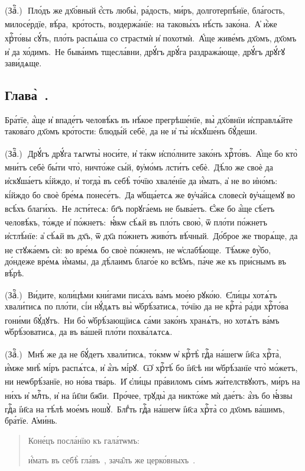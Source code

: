 (Заⷱ҇\:.)~\textsuperscript{}\,Пло́дъ же дх҃о́вный є҆́сть любы̀, ра́дость, ми́ръ, долготерпѣ́нїе, бла́гость, милосе́рдїе, вѣ́ра, \textsuperscript{}\,кро́тость, воздержа́нїе: на таковы́хъ нѣ́сть зако́на. \textsuperscript{}\,А҆ и҆̀же хрⷭ҇то́вы сꙋ́ть, пло́ть распѧ́ша со страстмѝ и҆ похотмѝ. \textsuperscript{}\,А҆́ще живе́мъ дх҃омъ, дх҃омъ и҆ да хо́димъ. \textsuperscript{}\,Не быва́имъ тщесла́вни, дрꙋ́гъ дрꙋ́га раздража́юще, дрꙋ́гъ дрꙋ́гꙋ зави́дѧще.

\subsection{Глава̀~.}

\cuLettrine Бра́тїе, а҆́ще и҆ впаде́тъ человѣ́къ въ нѣ́кое прегрѣше́нїе, вы̀ дх҃о́внїи и҆справлѧ́йте такова́го дх҃омъ кро́тости: блюды́й себѐ, да не и҆ ты̀ и҆скꙋше́нъ бꙋ́деши.

(Заⷱ҇\:.)~\textsuperscript{}\,Дрꙋ́гъ дрꙋ́га тѧгѡты̀ носи́те, и҆ та́кѡ и҆спо́лните зако́нъ хрⷭ҇то́въ. \textsuperscript{}\,А҆́ще бо кто̀ мни́тъ себѐ бы́ти что̀, ничто́же сы́й, ᲂу҆мо́мъ лсти́тъ себѐ. \textsuperscript{}\,Дѣ́ло же своѐ да и҆скꙋша́етъ кі́йждо, и҆ тогда̀ въ себѣ̀ то́чїю хвале́нїе да и҆́мать, а҆ не во и҆но́мъ: \textsuperscript{}\,кі́йждо бо своѐ бре́мѧ понесе́тъ. \textsuperscript{}\,Да ѡ҆бща́етсѧ же ᲂу҆ча́йсѧ словесѝ ᲂу҆ча́щемꙋ во всѣ́хъ благи́хъ. \textsuperscript{}\,Не лсти́тесѧ: бг҃ъ порꙋга́емь не быва́етъ. Є҆́же бо а҆́ще сѣ́етъ человѣ́къ, то́жде и҆ по́жнетъ: \textsuperscript{}\,ꙗ҆́кѡ сѣ́ѧй въ пло́ть свою̀, ѿ пло́ти по́жнетъ и҆стлѣ́нїе: а҆ сѣ́ѧй въ дх҃ъ, ѿ дх҃а по́жнетъ живо́тъ вѣ́чный. \textsuperscript{}\,До́брое же творѧ́ще, да не стꙋжа́емъ сѝ: во вре́мѧ бо своѐ по́жнемъ, не ѡ҆слабѣ́юще. \textsuperscript{}\,Тѣ́мже ᲂу҆̀бо, до́ндеже вре́мѧ и҆́мамы, да дѣ́лаимъ благо́е ко всѣ̑мъ, па́че же къ при́снымъ въ вѣ́рѣ.

(Заⷱ҇\:.)~\textsuperscript{}\,Ви́дите, коли́цѣми кни́гами писа́хъ ва́мъ мое́ю рꙋко́ю. \textsuperscript{}\,Є҆ли́цы хотѧ́тъ хвали́тисѧ по пло́ти, сі́и нꙋ́дѧтъ вы̀ ѡ҆брѣ́затисѧ, то́чїю да не крⷭ҇та̀ ра́ди хрⷭ҇то́ва гони́ми бꙋ́дꙋтъ. \textsuperscript{}\,Ни бо̀ ѡ҆брѣ́зающїисѧ са́ми зако́нъ хранѧ́тъ, но хотѧ́тъ ва́мъ ѡ҆брѣ́зоватисѧ, да въ ва́шей пло́ти похва́лѧтсѧ.

(Заⷱ҇.)~\textsuperscript{}\,Мнѣ́ же да не бꙋ́детъ хвали́тисѧ, то́кмѡ ѡ҆ крⷭ҇тѣ̀ гдⷭ҇а на́шегѡ і҆и҃са хрⷭ҇та̀, и҆́мже мнѣ̀ мі́ръ распѧ́тсѧ, и҆ а҆́зъ мі́рꙋ. \textsuperscript{}\,Ѡ҆ хрⷭ҇тѣ́ бо і҆и҃сѣ ни ѡ҆брѣ́занїе что̀ мо́жетъ, ни неѡбрѣ́занїе, но но́ва тва́рь. \textsuperscript{}\,И҆ є҆ли́цы пра́виломъ си́мъ жи́телствꙋютъ, ми́ръ на ни́хъ и҆ млⷭ҇ть, и҆ на і҆и҃ли бж҃їи. \textsuperscript{}\,Про́чее, трꙋды̀ да никто́же мѝ дае́тъ: а҆́зъ бо ꙗ҆́звы гдⷭ҇а і҆и҃са на тѣ́лѣ мое́мъ ношꙋ̀. \textsuperscript{}\,Блгⷣть гдⷭ҇а на́шегѡ і҆и҃са хрⷭ҇та̀ со дх҃омъ ва́шимъ, бра́тїе. А҆ми́нь.

\noprelistbreak\begin{quotation}Коне́цъ посла́нїю къ гала́тѡмъ:

и҆́мать въ себѣ̀ гла́въ~, зача̑лъ же церко́вныхъ~.\end{quotation}
